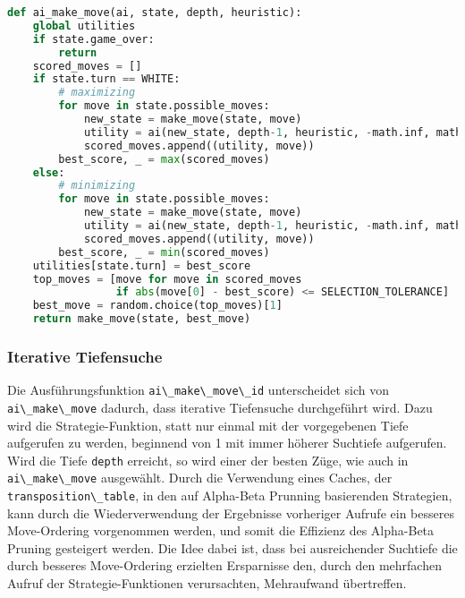 \begin{lstlisting}[language=Python]
def ai_make_move(ai, state, depth, heuristic):
    global utilities
    if state.game_over:
        return
    scored_moves = []
    if state.turn == WHITE:
        # maximizing
        for move in state.possible_moves:
            new_state = make_move(state, move)
            utility = ai(new_state, depth-1, heuristic, -math.inf, math.inf)
            scored_moves.append((utility, move))
        best_score, _ = max(scored_moves)
    else:
        # minimizing
        for move in state.possible_moves:
            new_state = make_move(state, move)
            utility = ai(new_state, depth-1, heuristic, -math.inf, math.inf)
            scored_moves.append((utility, move))
        best_score, _ = min(scored_moves)
    utilities[state.turn] = best_score
    top_moves = [move for move in scored_moves
                 if abs(move[0] - best_score) <= SELECTION_TOLERANCE]
    best_move = random.choice(top_moves)[1]
    return make_move(state, best_move)
\end{lstlisting}

\hypertarget{iterative-tiefensuche}{%
\subsubsection{Iterative Tiefensuche}\label{iterative-tiefensuche}}

Die Ausführungsfunktion \passthrough{\lstinline!ai\_make\_move\_id!}
unterscheidet sich von \passthrough{\lstinline!ai\_make\_move!} dadurch,
dass iterative Tiefensuche durchgeführt wird. Dazu wird die
Strategie-Funktion, statt nur einmal mit der vorgegebenen Tiefe
aufgerufen zu werden, beginnend von 1 mit immer höherer Suchtiefe
aufgerufen. Wird die Tiefe \passthrough{\lstinline!depth!} erreicht, so
wird einer der besten Züge, wie auch in
\passthrough{\lstinline!ai\_make\_move!} ausgewählt. Durch die
Verwendung eines Caches, der
\passthrough{\lstinline!transposition\_table!}, in den auf Alpha-Beta
Prunning basierenden Strategien, kann durch die Wiederverwendung der
Ergebnisse vorheriger Aufrufe ein besseres Move-Ordering vorgenommen
werden, und somit die Effizienz des Alpha-Beta Pruning gesteigert
werden. Die Idee dabei ist, dass bei ausreichender Suchtiefe die durch
besseres Move-Ordering erzielten Ersparnisse den, durch den mehrfachen
Aufruf der Strategie-Funktionen verursachten, Mehraufwand übertreffen.

